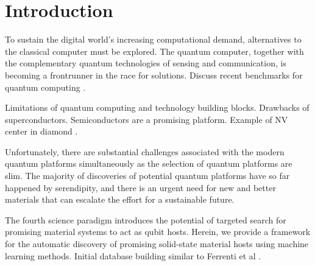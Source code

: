 \documentclass[superscriptaddress,unsortedaddress,
 amsmath,amssymb,
 aps,
]{revtex4-2}
\begin{document}




\maketitle



\section*{Introduction}%
To sustain the digital world’s increasing computational demand, alternatives to the classical computer must be explored. The quantum computer, together with the complementary quantum technologies of sensing and communication, is becoming a frontrunner in the race for solutions. 
Discuss recent benchmarks for quantum computing \cite{Arute_2019}. 

Limitations of quantum computing and technology building blocks. Drawbacks of superconductors. Semiconductors are a promising platform. Example of NV center in diamond \cite{Doherty_2013}. 

Unfortunately, there are substantial challenges associated with the modern quantum platforms simultaneously as the selection of quantum platforms are slim. The majority of discoveries of potential quantum platforms have so far happened by serendipity, and there is an urgent need for new and better materials that can escalate the effort for a sustainable future. 

The fourth science paradigm introduces the potential of targeted search for promising material systems to act as qubit hosts. 
Herein, we provide a framework for the automatic discovery of promising solid-state material hosts using machine learning methods. 
Initial database building similar to Ferrenti et al \cite{Ferrenti2020}. 
\end{document}
